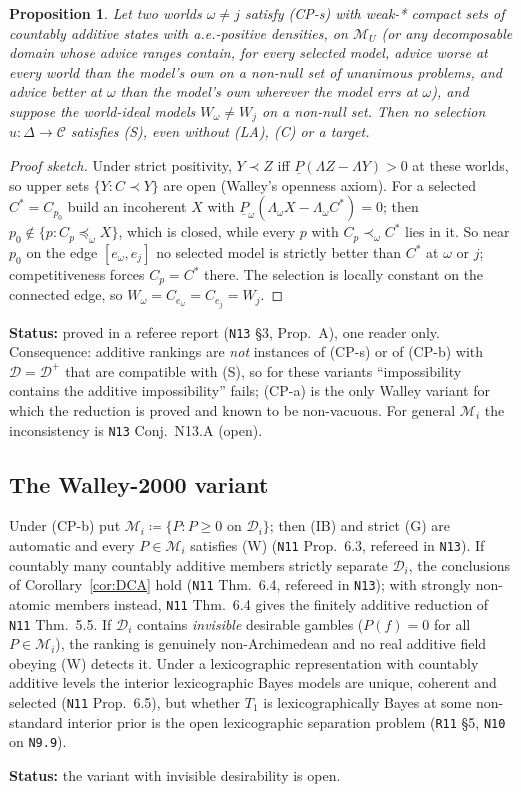 \documentclass[11pt]{article}
\newtheorem{proposition}[theorem]{Proposition}
\theoremstyle{definition}
\theoremstyle{remark}
\newcommand{\M}{\mathcal M}
\newcommand{\C}{\mathcal C}
\newcommand{\lp}{\underline{P}}
\newcommand{\src}[1]{\texttt{#1}}
\newcommand{\status}[1]{\par\smallskip\noindent\textbf{Status:} #1\par\smallskip}
\begin{document}
\begin{proposition}\label{prop:A}
Let two worlds $\omega\ne j$ satisfy (CP-s) with weak-* compact sets of countably additive states with a.e.-positive densities, on $\M_U$ (or any decomposable domain whose advice ranges contain, for every selected model, advice worse at every world than the model's own on a non-null set of unanimous problems, and advice better at $\omega$ than the model's own wherever the model errs at $\omega$), and suppose the world-ideal models $W_\omega\ne W_j$ on a non-null set. Then no selection $u:\Delta\to\C$ satisfies (S), even without (LA), (C) or a target.
\end{proposition}
\begin{proof}[Proof sketch]
Under strict positivity, $Y\prec Z$ iff $\lp(\Lambda Z-\Lambda Y)>0$ at these worlds, so upper sets $\{Y:C\prec Y\}$ are open (Walley's openness axiom). For a selected $C^*=C_{p_0}$ build an incoherent $X$ with $\lp_\omega(\Lambda_\omega X-\Lambda_\omega C^*)=0$; then $p_0\notin\{p:C_p\preceq_\omega X\}$, which is closed, while every $p$ with $C_p\prec_\omega C^*$ lies in it. So near $p_0$ on the edge $[e_\omega,e_j]$ no selected model is strictly better than $C^*$ at $\omega$ or $j$; competitiveness forces $C_p=C^*$ there. The selection is locally constant on the connected edge, so $W_\omega=C_{e_\omega}=C_{e_j}=W_j$.
\end{proof}
\status{proved in a referee report (\src{N13} \S3, Prop.~A), one reader only. Consequence: additive rankings are \emph{not} instances of (CP-s) or of (CP-b) with $\mathcal D=\mathcal D^+$ that are compatible with (S), so for these variants ``impossibility contains the additive impossibility'' fails; (CP-a) is the only Walley variant for which the reduction is proved and known to be non-vacuous. For general $\M_i$ the inconsistency is \src{N13} Conj.~N13.A (open).}

\subsection{The Walley-2000 variant}\label{sec:cp-b}
Under (CP-b) put $\M_i\coloneqq\{P:P\ge0\text{ on }\mathcal D_i\}$; then (IB) and strict (G) are automatic and every $P\in\M_i$ satisfies (W) (\src{N11} Prop.~6.3, refereed in \src{N13}). If countably many countably additive members strictly separate $\mathcal D_i$, the conclusions of Corollary~\ref{cor:DCA} hold (\src{N11} Thm.~6.4, refereed in \src{N13}); with strongly non-atomic members instead, \src{N11} Thm.~6.4 gives the finitely additive reduction of \src{N11} Thm.~5.5. If $\mathcal D_i$ contains \emph{invisible} desirable gambles ($P(f)=0$ for all $P\in\M_i$), the ranking is genuinely non-Archimedean and no real additive field obeying (W) detects it. Under a lexicographic representation with countably additive levels the interior lexicographic Bayes models are unique, coherent and selected (\src{N11} Prop.~6.5), but whether $T_1$ is lexicographically Bayes at some non-standard interior prior is the open lexicographic separation problem (\src{R11} \S5, \src{N10} on \src{N9.9}).
\status{the variant with invisible desirability is open.}
\end{document}
